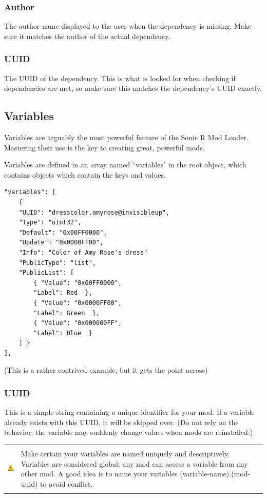 \documentclass[12pt,a4paper,notitlepage]{article}
\newcommand{\warning}[1]{
    \begin{tabular}{m{1.1cm}  m{11cm}}
    &\\
    \includegraphics[width=1.1cm, height=1.1cm]{warning} & #1
    \\&\\
    \end{tabular}
}
\begin{document}
\subsubsection{Author}
The author name displayed to the user when the dependency is missing. Make sure it matches the author of the actual dependency.

\subsubsection{UUID}
The UUID of the dependency. This is what is looked for when checking if dependencies are met, so make sure this matches the dependency's UUID exactly.

\subsection{Variables}
\label{subsec:create-var}
Variables are arguably the most powerful feature of the Sonic R Mod Loader. Mastering their use is the key to creating great, powerful mods.

Variables are defined in an array named ``variables" in the root object, which contains objects which contain the keys and values.

\begin{lstlisting}[breaklines=true]
"variables": [
    {	
    "UUID": "dresscolor.amyrose@invisibleup",
    "Type": "uInt32",
    "Default": "0x00FF0000",
    "Update": "0x0000FF00",
    "Info": "Color of Amy Rose's dress"
    "PublicType": "list",
    "PublicList": [
        { "Value": "0x00FF0000",
        "Label": Red  },
        { "Value": "0x0000FF00",
        "Label": Green  },
        { "Value": "0x000000FF",
        "Label": Blue  }
    ] }
],
\end{lstlisting}
(This is a rather contrived example, but it gets the point across)

\subsubsection{UUID}
\label{subsubsec:create-var-uuid}
This is a simple string containing a unique identifier for your mod.
If a variable already exists with this UUID, it will be skipped over. (Do not rely on the behavior; the variable may suddenly change values when mods are reinstalled.)

\warning{Make certain your variables are named uniquely and descriptively. Variables are considered global; any mod can access a variable from any other mod. A good idea is to name your variables (variable-name).(mod-uuid) to avoid conflict.}
\end{document}
